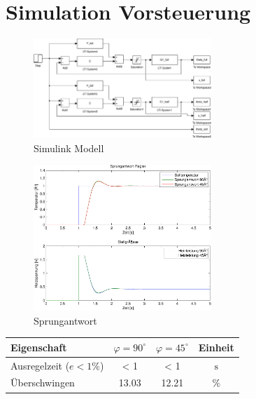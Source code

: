 \section{Simulation Vorsteuerung}
\begin{figure}[h!]
    \centering
    \includegraphics[width=0.6\textwidth]{10/vorsteuerung_mdl.pdf}
    \caption{Simulink Modell}
    \label{fig:10a}
\end{figure}
\begin{figure}[h!]
    \centering
    \includegraphics[width=0.6\textwidth]{10/vorsteuerung_plot.pdf}
    \caption{Sprungantwort}
    \label{fig:10b}
\end{figure}
\begin{table}[h!]
	\centering
	\begin{tabular}{l c c c}
		Eigenschaft
			& $\varphi = 90^\circ$
			& $\varphi = 45^\circ$ 
			& Einheit\\
		\hline
		Ausregelzeit ($e < 1\%$)
			& < 1
			& < 1
            & $\si{\second}$ \\
		Überschwingen
			& 13.03
			& 12.21
			& $\%$
	\end{tabular}
\end{table}

